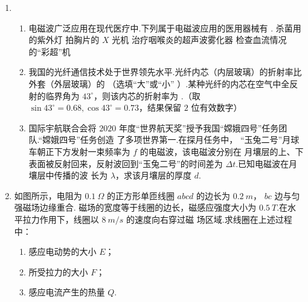 \begin{enumerate}



\item 

\begin{enumerate}
\item
电磁波广泛应用在现代医疗中.下列属于电磁波应用的医用器械有 \underlinegap .
\fourchoices
{杀菌用的紫外灯}
{拍胸片的 $ X $ 光机}
{治疗咽喉炎的超声波雾化器}
{检查血流情况的“彩超”机}






\item 
我国的光纤通信技术处于世界领先水平.光纤内芯（内层玻璃）的折射率比外套（外层玻璃）的
\underlinegap （选填“大”或“小”
）.某种光纤的内芯在空气中全反射的临界角为 $ 43 ^{ \circ } $，则该内芯的折射率为 \underlinegap .（取
$ \sin 43 ^{ \circ } =0.68, \cos 43 ^{ \circ } =0.73 $，结果保留 $ 2 $ 位有效数字）







\item 
国际宇航联合会将 $ 2020 $ 年度“世界航天奖”授予我国“嫦娥四号”任务团队.“嫦娥四号”任务创造
了多项世界第一.在探月任务中，
“玉兔二号”月球车朝正下方发射一束频率为 $ f $ 的电磁波，该电磁波分别在
月壤层的上、下表面被反射回来，反射波回到“玉兔二号”的时间差为 $ \Delta t $.已知电磁波在月壤层中传播的波
长为 $ \lambda $，求该月壤层的厚度 $ d $.






\end{enumerate}



\gaokaojs



\item
如图所示，电阻为 $ 0.1 \ \Omega $ 的正方形单匝线圈 $ abcd $ 的边长为 $ 0.2 \ m $， $ bc $ 边与匀强磁场边缘重合.
磁场的宽度等于线圈的边长，磁感应强度大小为 $ 0.5 \ T $.在水平拉力作用下，线圈以 $ 8 \ m/s $ 的速度向右穿过磁
场区域.求线圈在上述过程中：
\begin{enumerate}
\item
感应电动势的大小 $ E $；
\item 
所受拉力的大小 $ F $；
\item 
感应电流产生的热量 $ Q $.


\end{enumerate}
\end{enumerate}

